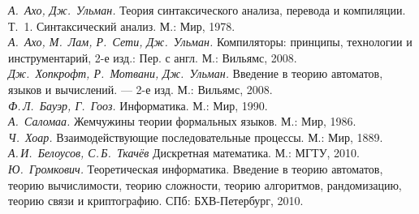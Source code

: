 
\begin{thebibliography}{9}

 \emph{А.~Ахо, Дж.~Ульман.} Теория синтаксического анализа, перевода и компиляции. Т.~1. Синтаксический анализ. М.: Мир, 1978. \\

 \emph{А.~Ахо, М.~Лам, Р.~Сети, Дж.~Ульман.} Компиляторы: принципы, технологии и инструментарий, 2-е изд.: Пер. с англ. М.: Вильямс, 2008. \\

 \emph{Дж.~Хопкрофт, Р.~Мотвани, Дж.~Ульман.}  Введение в теорию автоматов, языков и
вычислений. — 2-е изд. М.: Вильямс, 2008.\\


 \emph{Ф.\,Л.~Бауэр, Г.~Гооз.} Информатика. М.: Мир, 1990. \\

 \emph{А.~Саломаа.} Жемчужины теории формальных языков. М.: Мир, 1986. \\


 \emph{Ч.~Хоар.} Взаимодействующие последовательные процессы. М.: Мир, 1889.\\

 \emph{А.\,И.~Белоусов, С.\,Б.~Ткачёв} Дискретная математика. М.: МГТУ, 2010.\\

 \emph{Ю.~Громкович.} Теоретическая информатика. Введение в теорию автоматов, теорию вычислимости, теорию сложности, теорию алгоритмов, рандомизацию, теорию связи и криптографию. СПб: БХВ-Петербург, 2010.
\end{thebibliography}
